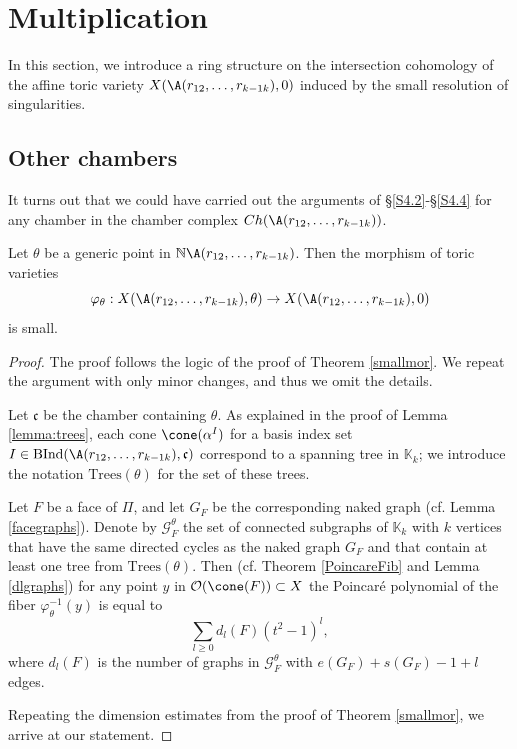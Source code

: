 \section{Multiplication}\label{sec:multi}

In this section, we introduce a ring structure on the intersection cohomology 
of the affine toric variety $X(\A(r_{12}, \ldots ,r_{k-1 k}),0)$ induced by the 
small resolution of singularities.

\subsection{Other chambers}\label{S6.1}

It turns out that we could have carried out the arguments of 
\S\ref{S4.2}-\S\ref{S4.4}  for any chamber in the chamber complex 
$Ch(\A(r_{12}, \ldots ,r_{k-1 
k}))$.

\begin{prop}\label{allsmall}
	Let $\theta$ be a generic point in $\mathbb{N}\A(r_{12}, \ldots ,r_{k-1 k})$. 
	Then the morphism of toric varieties $$\varphi_\theta: 
	X(\A(r_{12}, \ldots ,r_{k-1 
	k}), \theta)\to X(\A(r_{12}, \ldots ,r_{k-1 k}),0)$$ is small.
\end{prop}
\begin{proof}
	The proof follows the logic of the proof of Theorem \ref{smallmor}. We 
	repeat the argument with only minor changes, and thus we omit the details.
	
	Let $\mathfrak{c}$ be the chamber containing $\theta$. As explained in the proof of Lemma \ref{lemma:trees}, each cone 
	$\cone(\alpha^I)$ for a basis index set 
	$I\in\mathrm{BInd}(\A(r_{12}, \ldots ,r_{k-1 k}), \mathfrak{c})$ correspond to a 
	spanning tree in $\mathbb{K}_k$; we introduce the notation 
	$\mathrm{Trees}(\theta)$ for the set of these trees. 
	
	Let $F$ be a face of $\Pi$, and let $G_F$ be the corresponding naked graph 
	(cf.  Lemma \ref{facegraphs}).
	Denote by $\mathcal{G}^{\theta}_F$  the set of connected subgraphs of 
	$\mathbb{K}_k$  with $k$ vertices that have the same directed cycles as the 
	naked graph $G_F$ and that contain at least one tree from 
	$\mathrm{Trees}(\theta)$.
	Then (cf.  Theorem \ref{PoincareFib} and Lemma \ref{dlgraphs}) for any 
	point  $y$ in $\mathcal{O}(\cone(F))\subset X$ the Poincar\'e polynomial of 
	the fiber $\varphi_\theta^{-1}(y)$ is equal to
	$$\sum_{l\geq 0} d_l(F)(t^2-1)^l,$$
	where $d_l(F)$ is the number of graphs in $\mathcal{G}^{\theta}_F$ with 
	$e(G_F)+s(G_F)-1+l$ edges. 
	
	Repeating the dimension estimates from the proof of Theorem \ref{smallmor}, 
	we arrive at our statement.
\end{proof}
